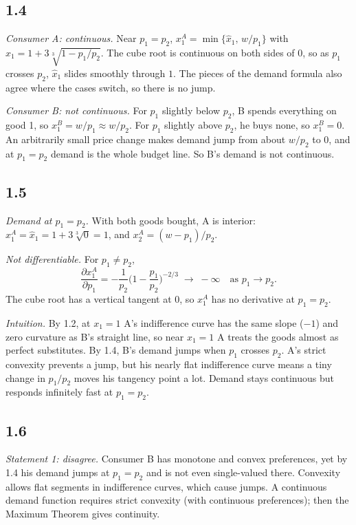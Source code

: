 \documentclass[12pt,letterpaper]{article}
\begin{document}
\subsection*{1.4}

\textit{Consumer A: continuous.} Near $p_1=p_2$, $x_1^A=\min\{\hat x_1,\,w/p_1\}$ with $\hat x_1=1+3\sqrt[3]{1-p_1/p_2}$. The cube root is continuous on both sides of $0$, so as $p_1$ crosses $p_2$, $\hat x_1$ slides smoothly through $1$. The pieces of the demand formula also agree where the cases switch, so there is no jump.

\textit{Consumer B: not continuous.} For $p_1$ slightly below $p_2$, B spends everything on good 1, so $x_1^B=w/p_1\approx w/p_2$. For $p_1$ slightly above $p_2$, he buys none, so $x_1^B=0$. An arbitrarily small price change makes demand jump from about $w/p_2$ to $0$, and at $p_1=p_2$ demand is the whole budget line. So B's demand is not continuous.

\subsection*{1.5}

\textit{Demand at $p_1=p_2$.} With both goods bought, A is interior: $x_1^A=\hat x_1=1+3\sqrt[3]{0}=1$, and $x_2^A=(w-p_1)/p_2$.

\textit{Not differentiable.} For $p_1\ne p_2$,
\[
\frac{\partial x_1^A}{\partial p_1} = -\frac{1}{p_2}\Big(1-\frac{p_1}{p_2}\Big)^{-2/3} \;\longrightarrow\; -\infty \quad\text{as } p_1\to p_2 .
\]
The cube root has a vertical tangent at $0$, so $x_1^A$ has no derivative at $p_1=p_2$.

\textit{Intuition.} By 1.2, at $x_1=1$ A's indifference curve has the same slope ($-1$) and zero curvature as B's straight line, so near $x_1=1$ A treats the goods almost as perfect substitutes. By 1.4, B's demand jumps when $p_1$ crosses $p_2$. A's strict convexity prevents a jump, but his nearly flat indifference curve means a tiny change in $p_1/p_2$ moves his tangency point a lot. Demand stays continuous but responds infinitely fast at $p_1=p_2$.

\subsection*{1.6}

\textit{Statement 1: disagree.} Consumer B has monotone and convex preferences, yet by 1.4 his demand jumps at $p_1=p_2$ and is not even single-valued there. Convexity allows flat segments in indifference curves, which cause jumps. A continuous demand function requires strict convexity (with continuous preferences); then the Maximum Theorem gives continuity.
\end{document}
